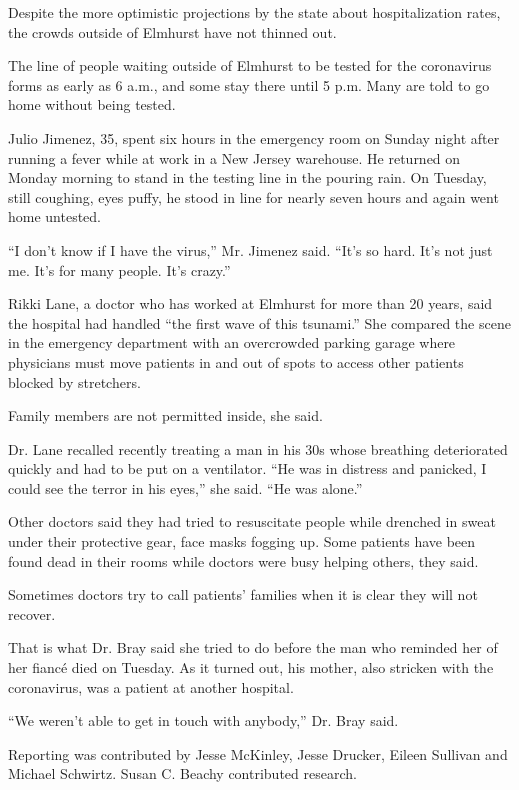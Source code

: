 Despite the more optimistic projections by the state about
hospitalization rates, the crowds outside of Elmhurst have not thinned
out.

The line of people waiting outside of Elmhurst to be tested for the
coronavirus forms as early as 6 a.m., and some stay there until 5 p.m.
Many are told to go home without being tested.

Julio Jimenez, 35, spent six hours in the emergency room on Sunday night
after running a fever while at work in a New Jersey warehouse. He
returned on Monday morning to stand in the testing line in the pouring
rain. On Tuesday, still coughing, eyes puffy, he stood in line for
nearly seven hours and again went home untested.

``I don't know if I have the virus,'' Mr. Jimenez said. ``It's so hard.
It's not just me. It's for many people. It's crazy.''

Rikki Lane, a doctor who has worked at Elmhurst for more than 20 years,
said the hospital had handled ``the first wave of this tsunami.'' She
compared the scene in the emergency department with an overcrowded
parking garage where physicians must move patients in and out of spots
to access other patients blocked by stretchers.

Family members are not permitted inside, she said.

Dr. Lane recalled recently treating a man in his 30s whose breathing
deteriorated quickly and had to be put on a ventilator. ``He was in
distress and panicked, I could see the terror in his eyes,'' she said.
``He was alone.''

Other doctors said they had tried to resuscitate people while drenched
in sweat under their protective gear, face masks fogging up. Some
patients have been found dead in their rooms while doctors were busy
helping others, they said.

Sometimes doctors try to call patients' families when it is clear they
will not recover.

That is what Dr. Bray said she tried to do before the man who reminded
her of her fiancé died on Tuesday. As it turned out, his mother, also
stricken with the coronavirus, was a patient at another hospital.

``We weren't able to get in touch with anybody,'' Dr. Bray said.

Reporting was contributed by Jesse McKinley, Jesse Drucker, Eileen
Sullivan and Michael Schwirtz. Susan C. Beachy contributed research.

